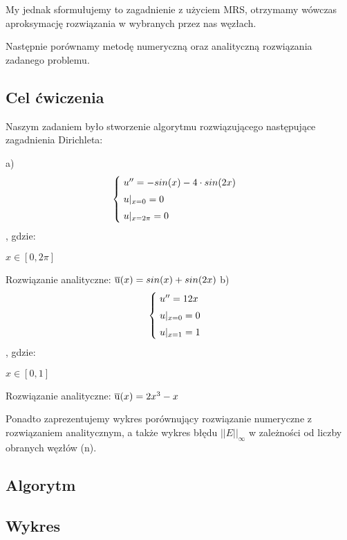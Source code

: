 My jednak sformułujemy to zagadnienie z użyciem MRS, otrzymamy wówczas aproksymację rozwiązania w wybranych przez nas węzłach.

Następnie porównamy metodę numeryczną oraz analityczną rozwiązania zadanego problemu.

\subsection{Cel ćwiczenia}

Naszym zadaniem było stworzenie algorytmu rozwiązującego następujące zagadnienia Dirichleta:

a)
\[
\begin{cases}
\vspace{0.1cm} 
\hspace{0,1cm}u''=-sin(x)-4\cdot sin(2x) \\
\vspace{0.1cm}
\hspace{0,1cm}u|_{x=0}=0 \\
\hspace{0,1cm}u|_{x=2\pi}=0
\end{cases}
\]
, gdzie:

$x\in [0,2\pi]$

Rozwiązanie analityczne: $\overline{\rm u}(x) = sin(x) +sin(2x)$
\newpage
b)
\[
\begin{cases}
\vspace{0.1cm} 
\hspace{0,1cm}u''=12x \\
\vspace{0.1cm}
\hspace{0,1cm}u|_{x=0}=0 \\
\hspace{0,1cm}u|_{x=1}=1
\end{cases}
\]
, gdzie:

$x\in [0,1]$

Rozwiązanie analityczne: $\overline{\rm u}(x) = 2x^{3}-x$

\vspace{0.3cm}
Ponadto zaprezentujemy wykres porównujący rozwiązanie numeryczne z rozwiązaniem analitycznym, a także wykres błędu $||E||_{\infty}$ w zależności od liczby obranych węzłów (n).

\subsection{Algorytm}

\subsection{Wykres}
 

